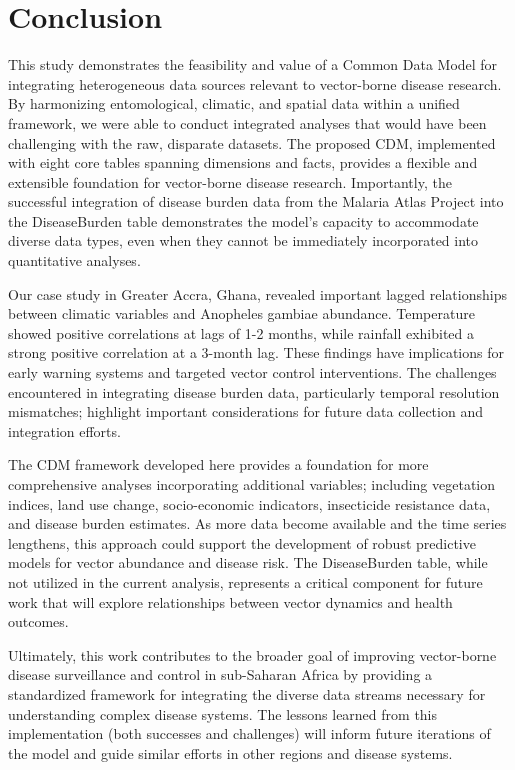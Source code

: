 \documentclass{article}
\begin{document}
\section{Conclusion}
\label{sec:conclusion}
\par
This study demonstrates the feasibility and value of a Common Data Model for integrating heterogeneous data sources relevant 
to vector-borne disease research. By harmonizing entomological, climatic, and spatial data within a unified framework, we were 
able to conduct integrated analyses that would have been challenging with the raw, disparate datasets. The proposed CDM, 
implemented with eight core tables spanning dimensions and facts, provides a flexible and extensible foundation for 
vector-borne disease research. Importantly, the successful integration of disease burden data from the Malaria Atlas 
Project into the DiseaseBurden table demonstrates the model's capacity to accommodate diverse data types, even when 
they cannot be immediately incorporated into quantitative analyses.
\par
Our case study in Greater Accra, Ghana, revealed important lagged relationships between climatic variables and 
Anopheles gambiae abundance. Temperature showed positive correlations at lags of 1-2 months, while rainfall 
exhibited a strong positive correlation at a 3-month lag. These findings have implications for early warning 
systems and targeted vector control interventions. The challenges encountered in integrating disease burden 
data, particularly temporal resolution mismatches; highlight important considerations for future data collection 
and integration efforts.
\par
The CDM framework developed here provides a foundation for more comprehensive analyses incorporating additional 
variables; including vegetation indices, land use change, socio-economic indicators, insecticide resistance data, and 
disease burden estimates. As more data become available and the time series lengthens, this approach could support the 
development of robust predictive models for vector abundance and disease risk. The DiseaseBurden table, while not 
utilized in the current analysis, represents a critical component for future work that will explore relationships 
between vector dynamics and health outcomes.
\par
Ultimately, this work contributes to the broader goal of improving vector-borne disease surveillance and control in 
sub-Saharan Africa by providing a standardized framework for integrating the diverse data streams necessary for 
understanding complex disease systems. The lessons learned from this implementation (both successes and challenges) 
will inform future iterations of the model and guide similar efforts in other regions and disease systems.
\end{document}
